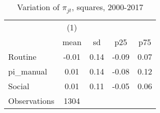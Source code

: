\begin{table}[htbp]\centering
\def\sym#1{\ifmmode^{#1}\else\(^{#1}\)\fi}
\caption{Variation of $\pi_{jt}$, squares, 2000-2017}
\begin{tabular}{l*{1}{cccc}}
\toprule
                    &\multicolumn{1}{c}{(1)}&            &            &            \\
                    &        mean&          sd&         p25&         p75\\
\midrule
Routine             &       -0.01&        0.14&       -0.09&        0.07\\
pi\_manual           &        0.01&        0.14&       -0.08&        0.12\\
Social              &        0.01&        0.11&       -0.05&        0.06\\
\midrule
Observations        &        1304&            &            &            \\
\bottomrule
\end{tabular}
\end{table}
